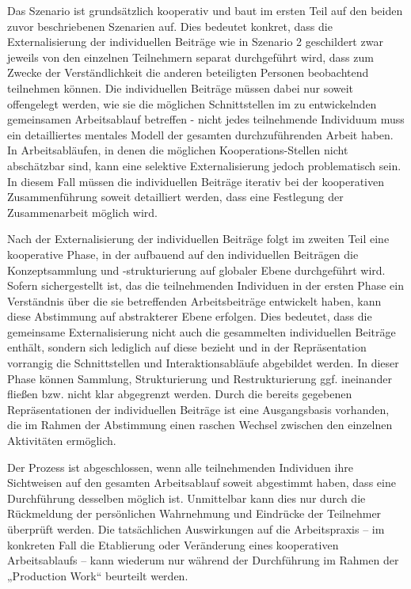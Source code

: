 Das Szenario ist grundsätzlich kooperativ und baut im ersten Teil auf den beiden zuvor beschriebenen Szenarien auf. Dies bedeutet konkret, dass die Externalisierung der individuellen Beiträge wie in Szenario 2 geschildert zwar jeweils von den einzelnen Teilnehmern separat durchgeführt wird, dass zum Zwecke der Verständlichkeit die anderen beteiligten Personen beobachtend teilnehmen können. Die individuellen Beiträge müssen dabei nur soweit offengelegt werden, wie sie die möglichen Schnittstellen im zu entwickelnden gemeinsamen Arbeitsablauf betreffen - nicht jedes teilnehmende Individuum muss ein detailliertes mentales Modell der gesamten durchzuführenden Arbeit haben. In Arbeitsabläufen, in denen die möglichen Kooperations-Stellen nicht abschätzbar sind, kann eine selektive Externalisierung jedoch problematisch sein. In diesem Fall müssen die individuellen Beiträge iterativ bei der kooperativen Zusammenführung soweit detailliert werden, dass eine Festlegung der Zusammenarbeit möglich wird.

Nach der Externalisierung der individuellen Beiträge folgt im zweiten Teil eine kooperative Phase, in der aufbauend auf den individuellen Beiträgen die Konzeptsammlung und -strukturierung auf globaler Ebene durchgeführt wird. Sofern sichergestellt ist, das die teilnehmenden Individuen in der ersten Phase ein Verständnis über die sie betreffenden Arbeitsbeiträge entwickelt haben, kann diese Abstimmung auf abstrakterer Ebene erfolgen. Dies bedeutet, dass die gemeinsame Externalisierung nicht auch die gesammelten individuellen Beiträge enthält, sondern sich lediglich auf diese bezieht und in der Repräsentation vorrangig die Schnittstellen und Interaktionsabläufe abgebildet werden. In dieser Phase können Sammlung, Strukturierung und Restrukturierung ggf. ineinander fließen bzw. nicht klar abgegrenzt werden. Durch die bereits gegebenen Repräsentationen der individuellen Beiträge ist eine Ausgangsbasis vorhanden, die im Rahmen der Abstimmung einen raschen Wechsel zwischen den einzelnen Aktivitäten ermöglich.

Der Prozess ist abgeschlossen, wenn alle teilnehmenden Individuen ihre Sichtweisen auf den gesamten Arbeitsablauf soweit abgestimmt haben, dass eine Durchführung desselben möglich ist. Unmittelbar kann dies nur durch die Rückmeldung der persönlichen Wahrnehmung und Eindrücke der Teilnehmer überprüft werden. Die tatsächlichen Auswirkungen auf die Arbeitspraxis -- im konkreten Fall die Etablierung oder Veränderung eines kooperativen Arbeitsablaufs -- kann wiederum nur während der Durchführung im Rahmen der „Production Work“ beurteilt werden.


